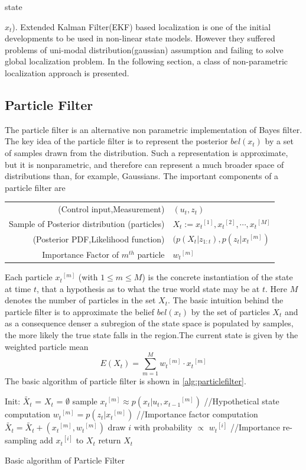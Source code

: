 state {$x_t$). Extended Kalman Filter(EKF) based localization is one of the initial developments to be used in non-linear state models. However they suffered problems of uni-modal distribution(gaussian) assumption and failing to solve global localization problem. In the following section, a class of non-parametric localization approach is presented. 
\subsection{Particle Filter}
\label{ssec:particlefilter}
	The particle filter\cite{Thrun2005} is an alternative non parametric implementation of Bayes filter. The key idea of the particle filter is to represent the posterior $bel(x_t)$ by a set of samples drawn from the distribution. Such a representation is approximate, but it is nonparametric, and therefore can represent a much broader space of distributions than, for example, Gaussians. The important components of a particle filter are\\
\begin{tabular}{r l}
\centering
  (Control input,Measurement) & $(u_t,z_t)$ \\ 
  Sample of Posterior distribution (particles) & $X_t := {x_t}^{[1]},{x_t}^{[2]},\cdots,{x_t}^{[M]}$ \\
  (Posterior PDF,Likelihood function) & $(p(X_t\vert z_{1:t}),p(z_t \vert {x_t}^{[m]})$ \\
  Importance Factor of $m^{th}$ particle & ${w_t}^{[m]}$ \\
\end{tabular}
	
	Each particle ${x_t}^{[m]}$ (with $1 \leq m \leq M$) is the concrete instantiation of the state at time $t$, that a hypothesis as to what the true world state may be at $t$. Here $M$ denotes the number of particles in the set $X_t$. The basic intuition behind the particle filter is to approximate the belief $bel(x_t)$ by the set of particles $X_t$ and as a consequence denser a subregion of the state space is populated by samples, the more likely the true state falls in the region.The current state is given by the weighted particle mean 
\begin{equation}
E(X_t) = \sum_{m=1}^{M} {w_t}^{[m]}\cdot {x_t}^{[m]}
\end{equation}
The basic algorithm of particle filter is shown in \ref{alg:particlefilter}.\\ 
\begin{algorithm}
Init: {$\tilde{X_t}$ = $X_t$ = $\emptyset$ } \;
  { 
   sample ${x_t}^{[m]} \approx p(x_t \vert u_t,{x_{t-1}}^{[m]}) $ //Hypothetical state computation \;
   ${w_t}^{[m]} = p(z_t \vert {x_t}^{[m]} )$ //Importance factor computation\;
   $\tilde{X_t} = \tilde{X_t} + ({x_t}^{[m]},{w_t}^{[m]})$ \;
 }
  { 
   draw $i$ with probability $\varpropto$ ${w_t}^{[i]}$ //Importance re-sampling\;
   add ${x_t}^{[i]}$ to $X_t$ \;
 }
 return $X_t$
 \caption{Basic algorithm of Particle Filter}
 \label{alg:particlefilter}
\end{algorithm}
}
